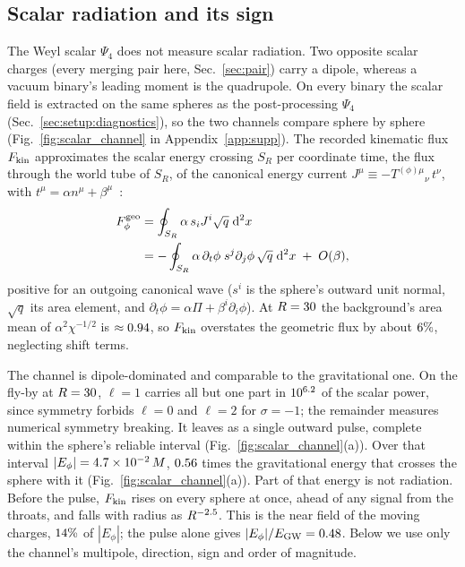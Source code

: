 \documentclass[twocolumn,floatfix,aps,prd,superscriptaddress,nofootinbib,showkeys]{revtex4-2}
\begin{document}
\subsection{Scalar radiation and its sign}
\label{sec:gw:scalar}

The Weyl scalar $\Psi_4$ does not measure scalar radiation. Two opposite scalar charges (every merging pair here, Sec.~\ref{sec:pair}) carry a dipole, whereas a vacuum binary's leading moment is the quadrupole. On every binary the scalar field is extracted on the same spheres as the post-processing $\Psi_4$ (Sec.~\ref{sec:setup:diagnostics}), so the two channels compare sphere by sphere (Fig.~\ref{fig:scalar_channel} in Appendix~\ref{app:supp}). The recorded kinematic flux $F_{\rm kin}$ approximates the scalar energy crossing $S_R$ per coordinate time, the flux through the world tube of $S_R$, of the canonical energy current $J^\mu\equiv-T^{(\phi)\mu}{}_{\nu}\,t^\nu$, with $t^\mu=\alpha n^\mu+\beta^\mu$~\cite{clough2021,gourgoulhon2012}:
\begin{equation}
\begin{split}
F^{\rm geo}_\phi&=\oint_{S_R}\alpha\,s_iJ^i\sqrt{q}\;\mathrm{d}^2x\\
&=-\oint_{S_R}\alpha\,\partial_t\phi\;s^j\partial_j\phi\,\sqrt{q}\;\mathrm{d}^2x\;+\;O(\beta),
\end{split}
\label{eq:scalarflux}
\end{equation}
positive for an outgoing canonical wave ($s^i$ is the sphere's outward unit normal, $\sqrt{q}$ its area element, and $\partial_t\phi=\alpha\Pi+\beta^i\partial_i\phi$). At $R=30$ the background's area mean of $\alpha^2\chi^{-1/2}$ is $\approx0.94$, so $F_{\rm kin}$ overstates the geometric flux by about $6\%$, neglecting shift terms.

The channel is dipole-dominated and comparable to the gravitational one. On the fly-by at $R=30$, $\ell=1$ carries all but one part in $10^{6.2}$ of the scalar power, since symmetry forbids $\ell=0$ and $\ell=2$ for $\sigma=-1$; the remainder measures numerical symmetry breaking. It leaves as a single outward pulse, complete within the sphere's reliable interval (Fig.~\ref{fig:scalar_channel}(a)). Over that interval $|E_\phi|=4.7\times10^{-2}\,M$, $0.56$ times the gravitational energy that crosses the sphere with it (Fig.~\ref{fig:scalar_channel}(a)). Part of that energy is not radiation. Before the pulse, $F_{\rm kin}$ rises on every sphere at once, ahead of any signal from the throats, and falls with radius as $R^{-2.5}$. This is the near field of the moving charges, $14\%$ of $|E_\phi|$; the pulse alone gives $|E_\phi|/E_{\rm GW}=0.48$. Below we use only the channel's multipole, direction, sign and order of magnitude.
\end{document}
